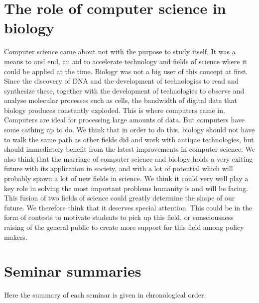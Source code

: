 \documentclass[a4paper]{article}
\begin{document}
\section{The role of computer science in biology}
Computer science came about not with the purpose to study itself. It was a means to and end, an aid to accelerate technology and fields of science where it could be applied at the time. Biology was not a big user of this concept at first. Since the discovery of DNA and the development of technologies to read and synthesize these, together with the development of technologies to observe and analyse molecular processes such as cells, the bandwidth of digital data that biology produces constantly exploded. This is where computers came in. Computers are ideal for processing large amounts of data. But computers have some cathing up to do. We think that in order to do this, biology should not have to walk the same path as other fields did and work with antique technologies, but should immediately benefit from the latest improvements in computer science. We also think that the marriage of computer science and biology holds a very exiting future with its application in society, and with a lot of potential which will probably spawn a lot of new fields in science. We think it could very well play a key role in solving the most important problems humanity is and will be facing. This fusion of two fields of science could greatly determine the shape of our future. We therefore think that it deserves special attention. This could be in the form of contests to motivate students to pick up this field, or consciousness raising of the general public to create more support for this field among policy makers.
\appendix

\section{Seminar summaries}
\label{abstracts}
Here the summary of each seminar is given in chronological order.





\end{document}
